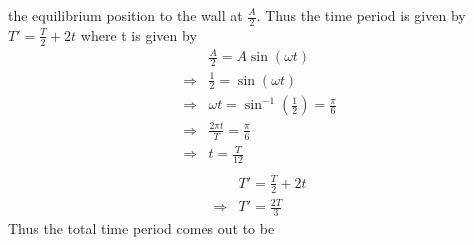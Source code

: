 \documentclass[addpoints]{exam}
\begin{document}
\begin{questions}
\begin{solution}
 the equilibrium position to the wall at $\frac{A}{2}$. Thus the time period is given by $T' = \frac{T}{2} + 2t$ where t is given by \\
 \begin{align*}
      &\frac{A}{2}  = A \sin(\omega t) \\
      \Rightarrow & \frac{1}{2} = \sin(\omega t)\\
      \Rightarrow & \omega t = \sin^{-1}\left(\frac{1}{2}\right) = \frac{\pi}{6} \\
      \Rightarrow & \frac{2\pi t}{T} = \frac{\pi}{6}\\
      \Rightarrow & t = \frac{T}{12}\\
 \end{align*}
\begin{align*}
      & T' = \frac{T}{2} + 2t \\
      \Rightarrow & T' = \frac{2T}{3}
 \end{align*} 
 Thus the total time period comes out to be  
 \begin{center}
 \end{center}
\end{solution}


\end{questions}
\end{document}
